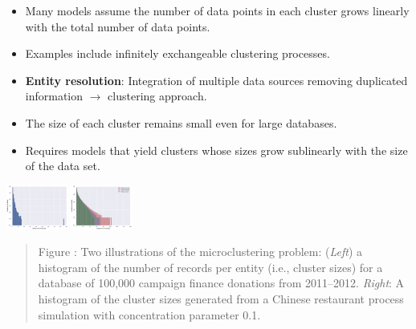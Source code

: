 \documentclass[portrait,a0b,final]{a0poster}
\newenvironment{poster}{
  \begin{center}
  \begin{minipage}[c]{0.98\textwidth}
}{
  \end{minipage}
  \end{center}
}
\newcommand{\pbox}[4]{
\psshadowbox[#3]{
\begin{minipage}[t][#2][t]{#1}
#4
\end{minipage}
}}
\newcommand{\mycaption}[1]{
  \vspace{0.25cm}
  \begin{quote}
    {{\sc Figure} \arabic{figure}: #1}
  \end{quote}
  \vspace{0.25cm}
  \stepcounter{figure}
}
\begin{document}
\begin{poster}
\begin{multicols}{3}
\vspace{.75cm}
\begin{center}
  \pbox{0.8\columnwidth}{}{linewidth=2mm,framearc=0.1,linecolor=lightblue,fillstyle=gradient,
    gradangle=0,gradbegin=white,gradend=whiteblue,gradmidpoint=1.0,framesep=1em}{
    \begin{center}
      {\large \bf Summary}
    \end{center}
  }
\end{center}
\vspace{.65cm}

\begin{itemize}

\item Many models  assume the number of data points in each cluster grows linearly with the total number of data points.
\item Examples include infinitely exchangeable clustering processes. 
\item \textbf{Entity resolution}: Integration of multiple data sources removing duplicated
information $\rightarrow$ clustering approach. 
\item The size of each cluster remains small even for large databases.
\item Requires models that yield clusters whose sizes grow sublinearly with the size of the data set.
\end{itemize}



  \begin{center}
      \includegraphics[width=0.15\textwidth]{donors_real.eps}
        \includegraphics[width=0.15\textwidth]{donors_synthetic.eps}
         \mycaption{Two illustrations of the microclustering problem: (\emph{Left}) a
      histogram of the number of records per entity (i.e., cluster
      sizes) for a database of 100,000 campaign finance donations from
      2011--2012.  \emph{Right}: 
      A histogram of the cluster sizes generated from a Chinese restaurant process simulation with 
      concentration parameter 0.1. }
    \label{fig:small_clustering}
  \end{center}
  

\end{multicols}
\end{poster}
\end{document}
